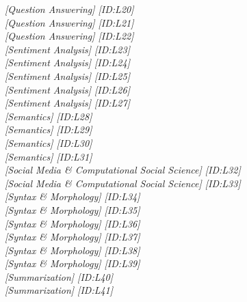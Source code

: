 \hfill \textit{[Question Answering]  [ID:L20]} \\ 
\hfill \textit{[Question Answering]  [ID:L21]} \\ 
\hfill \textit{[Question Answering]  [ID:L22]} \\ 
\hfill \textit{[Sentiment Analysis]  [ID:L23]} \\ 
\hfill \textit{[Sentiment Analysis]  [ID:L24]} \\ 
\hfill \textit{[Sentiment Analysis]  [ID:L25]} \\ 
\hfill \textit{[Sentiment Analysis]  [ID:L26]} \\ 
\hfill \textit{[Sentiment Analysis]  [ID:L27]} \\ 
\hfill \textit{[Semantics]  [ID:L28]} \\ 
\hfill \textit{[Semantics]  [ID:L29]} \\ 
\hfill \textit{[Semantics]  [ID:L30]} \\ 
\hfill \textit{[Semantics]  [ID:L31]} \\ 
\hfill \textit{[Social Media \& Computational Social Science]  [ID:L32]} \\ 
\hfill \textit{[Social Media \& Computational Social Science]  [ID:L33]} \\ 
\hfill \textit{[Syntax \& Morphology]  [ID:L34]} \\ 
\hfill \textit{[Syntax \& Morphology]  [ID:L35]} \\ 
\hfill \textit{[Syntax \& Morphology]  [ID:L36]} \\ 
\hfill \textit{[Syntax \& Morphology]  [ID:L37]} \\ 
\hfill \textit{[Syntax \& Morphology]  [ID:L38]} \\ 
\hfill \textit{[Syntax \& Morphology]  [ID:L39]} \\ 
\hfill \textit{[Summarization]  [ID:L40]} \\ 
\hfill \textit{[Summarization]  [ID:L41]} \\ 
